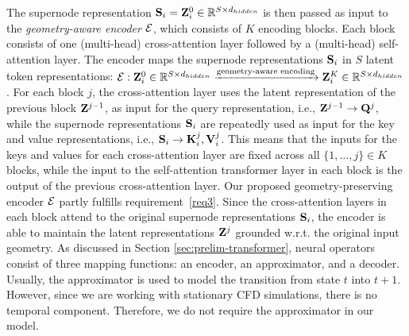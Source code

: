 The supernode representation $\mathbf{S}_{i} = \mathbf{Z}^0_{i} \in \mathbb{R}^{S \times d_{hidden}}$ is then passed as input to the \emph{geometry-aware encoder} $\mathcal{E}$, which consists of $K$ encoding blocks. 
Each block consists of one (multi-head) cross-attention layer followed by a (multi-head) self-attention layer. 
The encoder maps the supernode representations $\mathbf{S}_{i}$ in $S$ latent token representations: $\mathcal{E} :\mathbf{Z}_{i}^0 \in \mathbb{R}^{S \times d_{hidden}} \xrightarrow[]{\text{geometry-aware encoding}} \mathbf{Z}^K_{i} \in \mathbb{R}^{S \times d_{hidden}}$.
For each block $j$, the cross-attention layer uses the latent representation of the previous block $\mathbf{Z}^{j-1}$,  as input for the query representation, i.e., $\mathbf{Z}^{j-1} \rightarrow \mathbf{Q}^{j}$, while the supernode representations $\mathbf{S}_{i}$ are repeatedly used as input for the key and value representations, i.e., $\mathbf{S}_{i} \rightarrow \mathbf{K}_{i}^{j},\mathbf{V}_{i}^{j}$. 
This means that the inputs for the keys and values for each cross-attention layer are fixed across all $\{1, \dots, j\} \in K$ blocks, while the input to the self-attention transformer layer in each block is the output of the previous cross-attention layer.
Our proposed geometry-preserving encoder $\mathcal{E}$ partly fulfills requirement~\ref{req3}. 
Since the cross-attention layers in each block attend to the original supernode representations $\mathbf{S}_{i}$, the encoder is able to maintain the latent representations $\mathbf{Z}^{j}$ grounded w.r.t. the original input geometry.
As discussed in Section \ref{sec:prelim-transformer}, neural operators consist of three mapping functions: an encoder, an approximator, and a decoder. 
Usually, the approximator is used to model the transition from state $t$ into $t+1$. 
However, since we are working with stationary \ac{CFD} simulations, there is no temporal component. 
Therefore, we do not require the approximator in our model.

